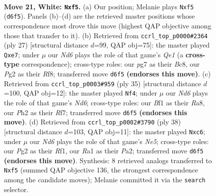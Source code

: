 \documentclass[11pt]{article}
\begin{document}
\clearpage

\begin{figure}[p]\centering
\begin{subfigure}{0.46\textwidth}\centering
\resizebox{\linewidth}{!}{%
\newchessgame
\chessboard[
  setfen={1nb1qrk1/1r3ppp/3Np3/2ppPn2/p4P2/6K1/PPP3PP/R2Q1BNR w - - 2 21},
  showmover=false,
  pgfstyle=straightmove, color=movearrow, markmove={d6-f5}
]}
\caption{}
\end{subfigure}\hfill
\begin{subfigure}{0.46\textwidth}\centering
\resizebox{\linewidth}{!}{%
\newchessgame
\chessboard[
  setfen={r1b1qrk1/p2nNppp/4p3/1p1n4/2pP1B2/2P2N2/PPB2PPP/R2Q1RK1 b - - 0 14},
  showmover=false,
  pgfstyle=straightmove, color=movearrow, markmove={e8-e7}
]}
\caption{}
\end{subfigure}
\\[4pt]
\begin{subfigure}{0.46\textwidth}\centering
\resizebox{\linewidth}{!}{%
\newchessgame
\chessboard[
  setfen={r2q2k1/2p2r1p/bpp2pp1/4p3/P2PP3/2PnRN2/5PPP/R1BQ2K1 b - - 2 18},
  showmover=false,
  pgfstyle=straightmove, color=movearrow, markmove={d3-f4}
]}
\caption{}
\end{subfigure}\hfill
\begin{subfigure}{0.46\textwidth}\centering
\resizebox{\linewidth}{!}{%
\newchessgame
\chessboard[
  setfen={r4rk1/p4ppp/1pb1p2q/3nN2n/3P4/6B1/PPR1QPPP/5RK1 w - - 0 20},
  showmover=false,
  pgfstyle=straightmove, color=movearrow, markmove={e5-c6}
]}
\caption{}
\end{subfigure}
\caption{\textbf{Move 21, White: \texttt{Nxf5}.} (a) Our position; Melanie plays \texttt{Nxf5} (\texttt{d6f5}). Panels (b)--(d) are the retrieved master positions whose correspondence most drove this move (highest QAP objective among those that transfer to it). (b) Retrieved from \texttt{ccrl\_top\_p0000\#2364} (ply 27) [structural distance $d$=99, QAP obj=75]: the master played \texttt{Qxe7}; under $\mu$ our \emph{Nd6} plays the role of that game's \emph{Qe1} (a \textbf{cross-type} correspondence); cross-type roles: our \emph{p}g7 as their \emph{B}c8, our \emph{P}g2 as their \emph{R}f8; transferred move \texttt{d6f5} \textbf{(endorses this move)}. (c) Retrieved from \texttt{ccrl\_top\_p0003\#959} (ply 35) [structural distance $d$=100, QAP obj=12]: the master played \texttt{Nf4}; under $\mu$ our \emph{Nd6} plays the role of that game's \emph{Nd6}; cross-type roles: our \emph{B}f1 as their \emph{R}a8, our \emph{P}h2 as their \emph{R}f7; transferred move \texttt{d6f5} \textbf{(endorses this move)}. (d) Retrieved from \texttt{ccrl\_top\_p0002\#3790} (ply 38) [structural distance $d$=103, QAP obj=11]: the master played \texttt{Nxc6}; under $\mu$ our \emph{Nd6} plays the role of that game's \emph{Ne5}; cross-type roles: our \emph{P}g2 as their \emph{R}f1, our \emph{R}a1 as their \emph{P}a2; transferred move \texttt{d6f5} \textbf{(endorses this move)}. Synthesis: 8 retrieved analogs transferred to \texttt{Nxf5} (summed QAP objective 136, the strongest correspondence among the candidate moves); Melanie committed it via the \texttt{search} selector.}
\label{fig:thought-m40}
\end{figure}
\end{document}
